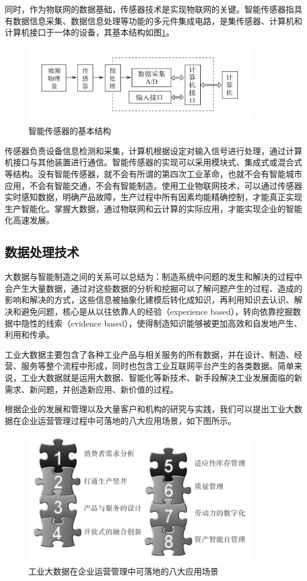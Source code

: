 \documentclass[lang=cn,12pt,bibtex,newtx,twoside,margintrue,citestyle=gb7714-2015, bibstyle=gb7714-2015]{elegantbook}
\begin{document}
同时，作为物联网的数据基础，传感器技术是实现物联网的关键。智能传感器指具有数据信息采集、数据信息处理等功能的多元件集成电路，是集传感器、计算机和计算机接口于一体的设备，其基本结构如图\ref{2.1}。

\begin{figure}[htbp]
\centering
\includegraphics[angle=0,width=10cm]{./figure/2.1.png}
\caption{\label{2.1}智能传感器的基本结构}
\end{figure}

传感器负责设备信息检测和采集，计算机根据设定对输入信号进行处理，通过计算机接口与其他装置进行通信。智能传感器的实现可以采用模块式、集成式或混合式等结构。没有智能传感器，就不会有所谓的第四次工业革命，也就不会有智能城市应用，不会有智能交通，不会有智能制造。使用工业物联网技术，可以通过传感器实时感知数据，明确产品故障，生产过程中所有因素均能精确控制，才能真正实现生产智能化。掌握大数据，通过物联网和云计算的实际应用，才能实现企业的智能化高速发展。

\subsection{数据处理技术}
\label{sec:org26caa7d}
大数据与智能制造之间的关系可以总结为：制造系统中问题的发生和解决的过程中会产生大量数据，通过对这些数据的分析和挖掘可以了解问题产生的过程、造成的影响和解决的方式，这些信息被抽象化建模后转化成知识，再利用知识去认识、解决和避免问题，核心是从以往依靠人的经验（experience based），转向依靠挖掘数据中隐性的线索（evidence based），使得制造知识能够被更加高效和自发地产生、利用和传承。

工业大数据主要包含了各种工业产品与相关服务的所有数据，并在设计、制造、经营、服务等整个流程中形成，同时也包含工业互联网平台产生的各类数据。简单来说，工业大数据就是运用大数据、智能化等新技术、新手段解决工业发展面临的新需求、新问题，并创造新应用、新价值的过程\cite{林国军2023}。

根据企业的发展和管理以及大量客户和机构的研究与实践，我们可以提出工业大数据在企业运营管理过程中可落地的八大应用场景，如下图所示。

\begin{figure}[htbp]
\centering
\includegraphics[angle=0,width=10cm]{./figure/2.2.png}
\caption{\label{2.2}工业大数据在企业运营管理中可落地的八大应用场景}
\end{figure}
\end{document}
